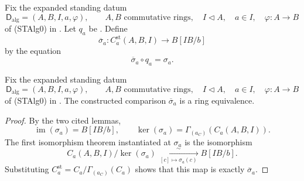 \begin{definition}
  \label{def:nagata-strict-transform-chart-comparison}

  Fix the expanded standing datum
  \[
    \mathsf D_{\mathrm{alg}}=(A,B,I,a,\varphi),\qquad
    A,B\text{ commutative rings},\quad
    I\triangleleft A,\quad a\in I,\quad
    \varphi\colon A\to B
  \]
  of (STAlg0) in
  .
  Let $q_a$ be .  Define
  \[
    \overline\sigma_a\colon
      C_a^{\mathrm{st}}(A,B,I)\longrightarrow B[IB/b]
  \]
  by the equation
  \[
    \overline\sigma_a\circ q_a=\sigma_a.
  \]
\end{definition}

\begin{proposition}
  \label{prop:nagata-strict-transform-chart-iso}

  Fix the expanded standing datum
  \[
    \mathsf D_{\mathrm{alg}}=(A,B,I,a,\varphi),\qquad
    A,B\text{ commutative rings},\quad
    I\triangleleft A,\quad a\in I,\quad
    \varphi\colon A\to B
  \]
  of (STAlg0) in
  .
  The constructed comparison $\overline\sigma_a$ is a ring equivalence.
\end{proposition}

\begin{proof}
  By the two cited lemmas,
  \[
    \operatorname{im}(\sigma_a)=B[IB/b],\qquad
    \ker(\sigma_a)=\Gamma_{(a_C)}(C_a(A,B,I)).
  \]
  The first isomorphism theorem instantiated at $\sigma_a$ is the
  isomorphism
  \[
    C_a(A,B,I)/\ker(\sigma_a)
      \xrightarrow[\ [c]\mapsto\sigma_a(c)\ ]{\sim}B[IB/b].
  \]
  Substituting
  $C_a^{\mathrm{st}}=C_a/\Gamma_{(a_C)}(C_a)$ shows that this map is exactly
  $\overline\sigma_a$.
\end{proof}

